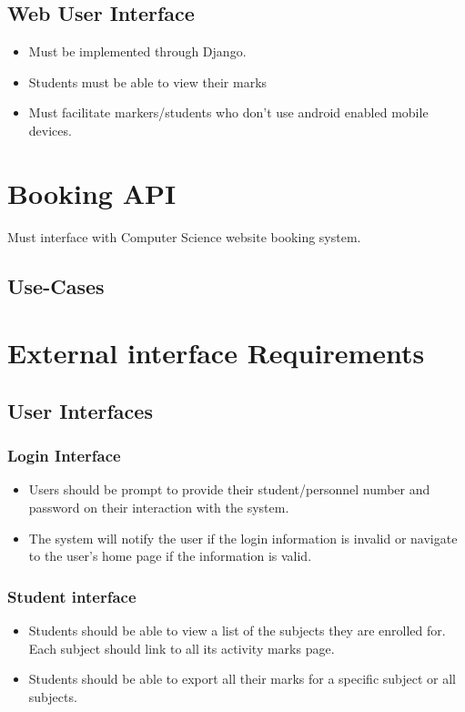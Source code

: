 \documentclass[10pt,a4paper]{article}
\begin{document}
	\subsection*{Web User Interface}
	\begin{itemize}
		\item Must be implemented through Django.
  		\item Students must be able to view their marks
  		\item Must facilitate markers/students who don't use android enabled mobile devices.
	\end{itemize}
	\section*{Booking API}
	Must interface with Computer Science website booking system.
\subsection{Use-Cases}
\section{External interface Requirements}
\label{External interface Requirements}


\subsection{User Interfaces}
\label{User Interfaces}


\subsubsection{Login Interface}
\label{Login Interface}
\begin{itemize}
\item Users should be prompt to provide their student/personnel number and password on their interaction with the system.	
\item The system will notify the user if the login information is invalid or navigate to the user's home page if the information is valid.
\end{itemize}
\subsubsection{Student interface}
\label{Student interface}
\begin{itemize}
\item Students should be able to view a list of the subjects they are enrolled for. Each subject should link to all its activity marks page.
\item Students should be able to export all their marks for a specific subject or all subjects.
\end{itemize}
\end{document}
